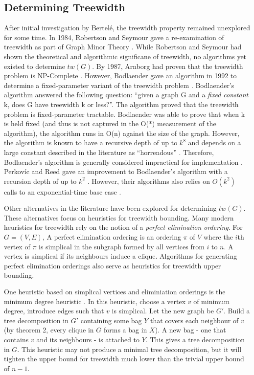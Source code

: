 \documentclass[12pt,conference]{IEEEtran}
\theoremstyle{plain}
\begin{document}
\subsection{Determining Treewidth}

After initial investigation by Bertelé, the treewidth property remained unexplored for some time. In 1984, Robertson and Seymour gave a re-examination of treewidth as part of Graph Minor Theory \cite{treewidth-rob-seymour}. While Robertson and Seymour had shown the theoretical and algorithmic significane of treewidth, no algorithms yet existed to determine $tw(G)$. By 1987, Arnborg had proven that the treewidth problem is NP-Complete \cite{arnborg-np-complete}. However, Bodlaender gave an algorithm in 1992 to determine a fixed-parameter variant of the treewidth problem \cite{bodlaender-1992}. Bodlaender's algorithm answered the following question: ``given a graph G and a \textit{fixed constant} k, does G have treewidth k or less?''. The algorithm proved that the treewidth problem is fixed-parameter tractable. Bodlaender was able to prove that when k is held fixed (and thus is not captured in the O(*) measurement of the algorithm), the algorithm runs in O(n) against the size of the graph. However, the algorithm is known to have a recursive depth of up to $k^{8}$ and depends on a large constant described in the literature as ``horrendous'' \cite{tw-alg-analysis}. Therefore, Bodlaender's algorithm is generally considered impractical for implementation \cite{fellows-on-bodlaender}. Perkov\'ic and Reed gave an improvement to Bodlaender's algorithm with a recursion depth of up to $k^{2}$ \cite{reed-tw-improvement}. However, their algorithms also relies on $O(k^{2})$ calls to an exponential-time base case \cite{tw-alg-analysis}.

Other alternatives in the literature have been explored for determining $tw(G)$. These alternatives focus on heuristics for treewidth bounding. Many modern heuristics for treewidth rely on the notion of a \textit{perfect elimination ordering}. For $G=(V,E)$, A perfect elimination ordering is an ordering $\pi$ of $V$ where the $i$th vertex of $\pi$ is simplical in the subgraph formed by all vertices from $i$ to $n$. A vertex is simplical if its neighbours induce a clique. Algorithms for generating perfect elimination orderings also serve as heuristics for treewidth upper bounding. 

One heuristic based on simplical vertices and eliminiation orderings is the minimum degree heuristic \cite{min-degree-upper-bound}. In this heuristic, choose a vertex $v$ of minimum degree, introduce edges such that $v$ is simplical. Let the new graph be $G'$. Build a tree decomposition in $G'$ containing some bag $Y$ that covers each neighbour of $v$ (by theorem 2, every clique in $G$ forms a bag in $X$). A new bag - one that contains $v$ and its neighbours - is attached to $Y$. This gives a tree decomposition in $G$. This heuristic may not produce a minimal tree decomposition, but it will tighten the upper bound for treewidth much lower than the trivial upper bound of $n-1$.
\end{document}

